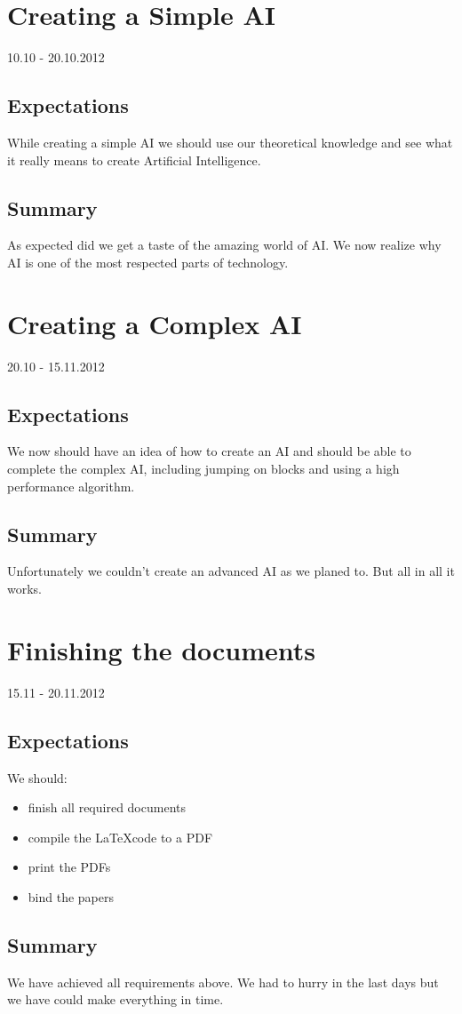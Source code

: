 \section{Creating a Simple AI}
10.10 - 20.10.2012
\subsection*{Expectations}
While creating a simple AI we should use our theoretical knowledge and see what it really means to create Artificial Intelligence.
\subsection*{Summary}
As expected did we get a taste of the amazing world of AI. We now realize why AI is one of the most respected parts of technology.

\section{Creating a Complex AI}
20.10 - 15.11.2012
\subsection*{Expectations}
We now should have an idea of how to create an AI and should be able to complete the complex AI, including jumping on blocks and using a high performance algorithm.
\subsection*{Summary}
Unfortunately we couldn't create an advanced AI as we planed to. But all in all it works.

\section{Finishing the documents}
15.11 - 20.11.2012
\subsection*{Expectations}
We should:
\begin{itemize}
  \item finish all required documents
  \item compile the \LaTeX code to a PDF
  \item print the PDFs
  \item bind the papers
\end{itemize}
\subsection*{Summary}
We have achieved all requirements above. We had to hurry in the last days but we have could make everything in time.


